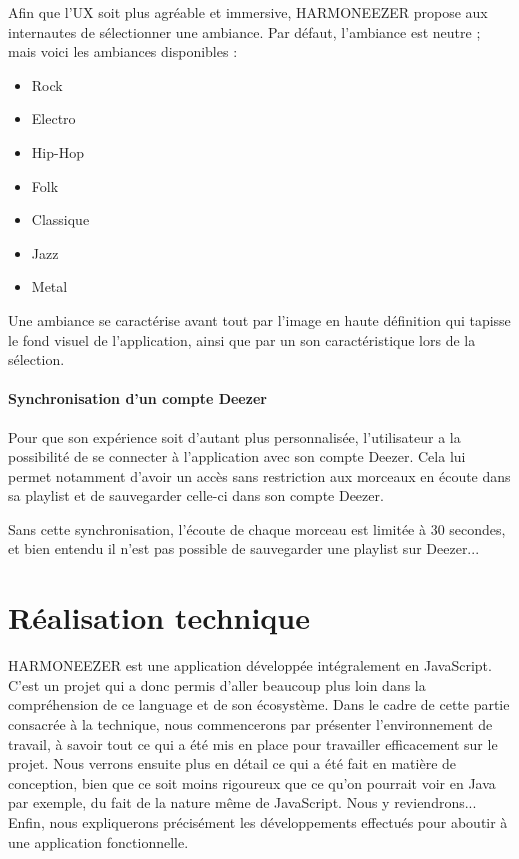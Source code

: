 \documentclass[a4paper,12pt]{article}
\begin{document}
Afin que l'UX soit plus agréable et immersive, HARMONEEZER propose aux internautes de sélectionner une ambiance. Par défaut, l'ambiance est neutre ; mais voici les ambiances disponibles :

\begin{itemize}
 \item{Rock}
 \item{Electro}
 \item{Hip-Hop}
 \item{Folk}
 \item{Classique}
 \item{Jazz}
 \item{Metal}
\end{itemize}

Une ambiance se caractérise avant tout par l'image en haute définition qui tapisse le fond visuel de l'application, ainsi que par un son caractéristique lors de la sélection.

\subsection{Synchronisation d'un compte Deezer}

Pour que son expérience soit d'autant plus personnalisée, l'utilisateur a la possibilité de se connecter à l'application avec son compte Deezer. Cela lui permet notamment d'avoir un accès sans restriction aux morceaux en écoute dans sa playlist et de sauvegarder celle-ci dans son compte Deezer.

Sans cette synchronisation, l'écoute de chaque morceau est limitée à 30 secondes, et bien entendu il n'est pas possible de sauvegarder une playlist sur Deezer...

\newpage


\part{Réalisation technique}

HARMONEEZER est une application développée intégralement en JavaScript. C'est un projet qui a donc permis d'aller beaucoup plus loin dans la compréhension de ce language et de son écosystème. Dans le cadre de cette partie consacrée à la technique, nous commencerons par présenter l'environnement de travail, à savoir tout ce qui a été mis en place pour travailler efficacement sur le projet. Nous verrons ensuite plus en détail ce qui a été fait en matière de conception, bien que ce soit moins rigoureux que ce qu'on pourrait voir en Java par exemple, du fait de la nature même de JavaScript. Nous y reviendrons... Enfin, nous expliquerons précisément les développements effectués pour aboutir à une application fonctionnelle.
\end{document}
